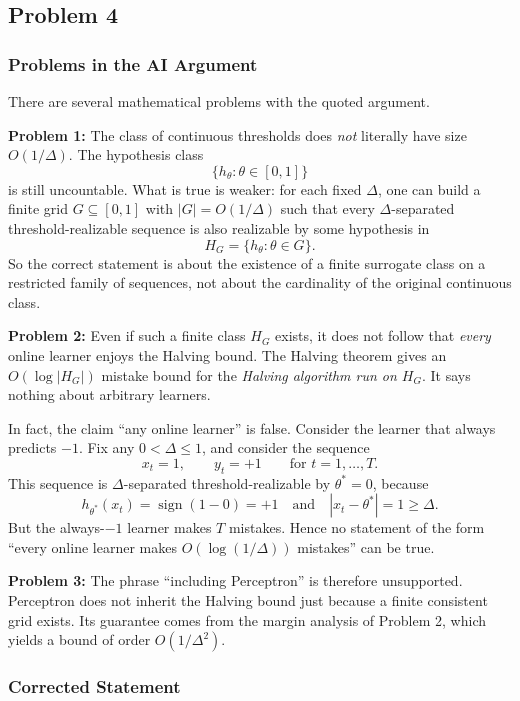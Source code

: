 \documentclass{article}
\begin{document}
\subsection{Problem 4}

\subsubsection{Problems in the AI Argument}

There are several mathematical problems with the quoted argument.

\textbf{Problem 1: } The class of continuous thresholds does \emph{not} literally have size
$O(1/\Delta)$. The hypothesis class
$$
\{h_\theta : \theta \in [0,1]\}
$$
is still uncountable. What is true is weaker: for each fixed $\Delta$, one can build a finite grid
$G \subseteq [0,1]$ with $|G| = O(1/\Delta)$ such that every $\Delta$-separated
threshold-realizable sequence is also realizable by some hypothesis in
$$
H_G = \{h_\theta : \theta \in G\}.
$$
So the correct statement is about the existence of a finite surrogate class on a restricted family
of sequences, not about the cardinality of the original continuous class.

\textbf{Problem 2: } Even if such a finite class $H_G$ exists, it does not follow that
\emph{every} online learner enjoys the Halving bound. The Halving theorem gives an
$O(\log |H_G|)$ mistake bound for the \emph{Halving algorithm run on $H_G$}. It says nothing about
arbitrary learners.

In fact, the claim ``any online learner'' is false. Consider the learner that always predicts $-1$.
Fix any $0 < \Delta \leq 1$, and consider the sequence
$$
x_t = 1, \qquad y_t = +1 \qquad \text{for } t=1,\dots,T.
$$
This sequence is $\Delta$-separated threshold-realizable by $\theta^* = 0$, because
$$
h_{\theta^*}(x_t) = \operatorname{sign}(1-0) = +1
\quad \text{and} \quad
|x_t-\theta^*| = 1 \geq \Delta.
$$
But the always-$-1$ learner makes $T$ mistakes. Hence no statement of the form ``every online
learner makes $O(\log(1/\Delta))$ mistakes'' can be true.

\textbf{Problem 3: } The phrase ``including Perceptron'' is therefore unsupported. Perceptron does
not inherit the Halving bound just because a finite consistent grid exists. Its guarantee comes from
the margin analysis of Problem 2, which yields a bound of order $O(1/\Delta^2)$.

\subsubsection{Corrected Statement}
\end{document}
